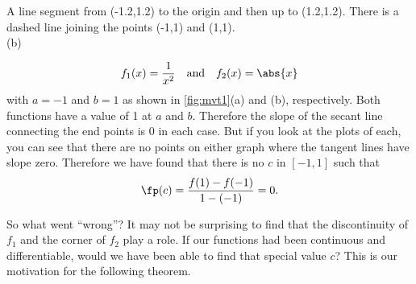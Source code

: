 \begin{example}
{{}{A line segment from (-1.2,1.2) to the origin and then up to (1.2,1.2).  There is a dashed line joining the points (-1,1) and (1,1).}
\\(b)}
%
\[f_1(x)=\frac{1}{x^2}\quad \text{and} \quad f_2(x) = \abs{x}\]
with $a=-1$ and $b=1$ as shown in \autoref{fig:mvt1}(a) and (b), respectively. Both functions have a value of 1 at $a$ and $b$.  Therefore the slope of the secant line connecting the end points is $0$ in each case.  But if you look at the plots of each, you can see that there are no points on either graph where the tangent lines have slope zero. Therefore we have found that there is no $c$ in $[-1,1]$ such that \[\fp(c) = \frac{f(1)-f(-1)}{1-(-1)} = 0.\]
\end{example}

So what went ``wrong\primeskip''?  It may not be surprising to find that the discontinuity of $f_1$ and the corner of $f_2$ play a role.  If our functions had been continuous and differentiable, would we have been able to find that special value $c$? This is our motivation for the following theorem.

